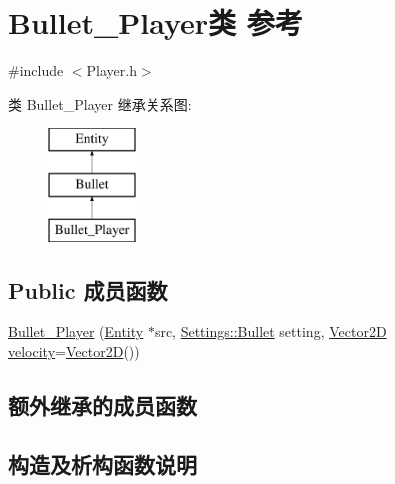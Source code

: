 \hypertarget{class_bullet___player}{}\section{Bullet\+\_\+\+Player类 参考}
\label{class_bullet___player}


{\ttfamily \#include $<$Player.\+h$>$}

类 Bullet\+\_\+\+Player 继承关系图\+:\begin{figure}[H]
\begin{center}
\leavevmode
\includegraphics[height=3.000000cm]{class_bullet___player}
\end{center}
\end{figure}
\subsection*{Public 成员函数}
\begin{DoxyCompactItemize}
\item 
\hyperlink{class_bullet___player_abcb87ef10b028f5fd603c70b4cda20d3}{Bullet\+\_\+\+Player} (\hyperlink{class_entity}{Entity} $\ast$src, \hyperlink{struct_settings_1_1_bullet}{Settings\+::\+Bullet} setting, \hyperlink{_vector2_d_8hpp_aa1f1145650f1dd9bddf7335ec6434d7c}{Vector2D} \hyperlink{class_entity_a386d25b56772b8913eb3e5adc636f6e0}{velocity}=\hyperlink{_vector2_d_8hpp_aa1f1145650f1dd9bddf7335ec6434d7c}{Vector2D}())
\end{DoxyCompactItemize}
\subsection*{额外继承的成员函数}


\subsection{构造及析构函数说明}
\mbox{\label{class_bullet___player_abcb87ef10b028f5fd603c70b4cda20d3}} 
